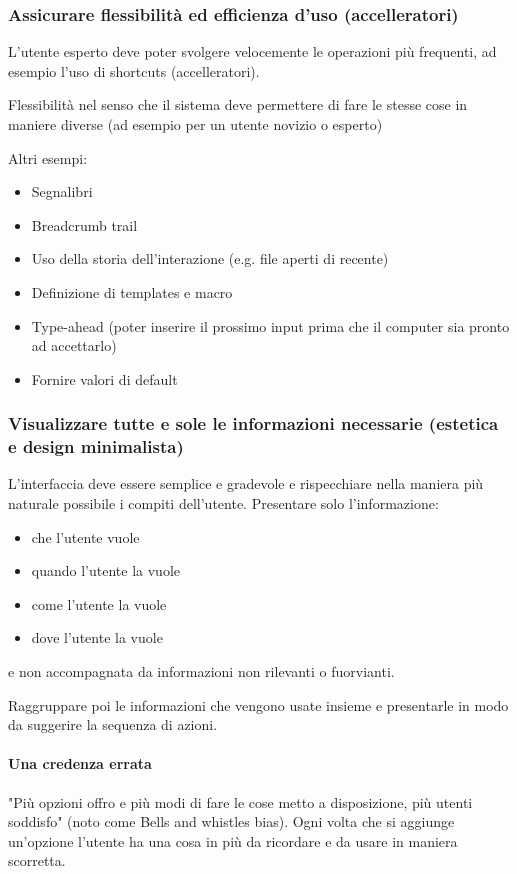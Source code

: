 \documentclass[11pt,a4paper]{book}
\begin{document}
\subsubsection{Assicurare flessibilità ed efficienza d'uso (accelleratori)}
L'utente esperto deve poter svolgere velocemente le operazioni più frequenti, ad esempio l'uso di shortcuts (accelleratori).

Flessibilità nel senso che il sistema deve permettere di fare le stesse cose in maniere diverse (ad esempio per un utente novizio o esperto)

Altri esempi:
\begin{itemize}
	\item Segnalibri
	\item Breadcrumb trail
	\item Uso della storia dell'interazione (e.g. file aperti di recente)
	\item Definizione di templates e macro
	\item Type-ahead (poter inserire il prossimo input prima che il computer sia pronto ad accettarlo)
	\item Fornire valori di default
\end{itemize}

\subsubsection{Visualizzare tutte e sole le informazioni necessarie (estetica e design minimalista)}
L'interfaccia deve essere semplice e gradevole e rispecchiare nella maniera più naturale possibile i compiti dell'utente. Presentare solo l'informazione:
\begin{itemize}
	\item che l'utente vuole
	\item quando l'utente la vuole
	\item come l'utente la vuole
	\item dove l'utente la vuole
\end{itemize}
e non accompagnata da informazioni non rilevanti o fuorvianti.

Raggruppare poi le informazioni che vengono usate insieme e presentarle in modo da suggerire la sequenza di azioni.

\paragraph{Una credenza errata}
"Più opzioni offro e più modi di fare le cose metto a disposizione, più utenti soddisfo" (noto come Bells and whistles bias). Ogni volta che si aggiunge un'opzione l'utente ha una cosa in più da ricordare e da usare in maniera scorretta.
\end{document}
